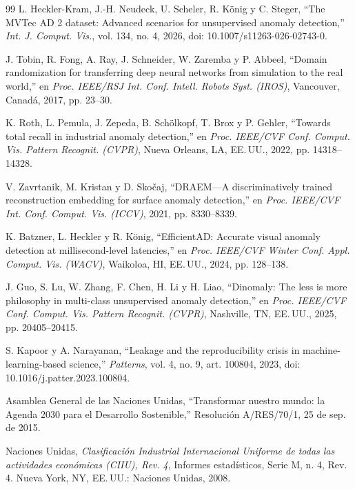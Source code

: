 \documentclass[12pt,oneside]{report}
\begin{document}
\begin{thebibliography}{99}
 L. Heckler-Kram, J.-H. Neudeck, U. Scheler, R. König y C. Steger, ``The MVTec AD 2 dataset: Advanced scenarios for unsupervised anomaly detection,'' \textit{Int. J. Comput. Vis.}, vol. 134, no. 4, 2026, doi: 10.1007/s11263-026-02743-0.

 J. Tobin, R. Fong, A. Ray, J. Schneider, W. Zaremba y P. Abbeel, ``Domain randomization for transferring deep neural networks from simulation to the real world,'' en \textit{Proc. IEEE/RSJ Int. Conf. Intell. Robots Syst. (IROS)}, Vancouver, Canadá, 2017, pp. 23--30.

 K. Roth, L. Pemula, J. Zepeda, B. Schölkopf, T. Brox y P. Gehler, ``Towards total recall in industrial anomaly detection,'' en \textit{Proc. IEEE/CVF Conf. Comput. Vis. Pattern Recognit. (CVPR)}, Nueva Orleans, LA, EE.\,UU., 2022, pp. 14318--14328.

 V. Zavrtanik, M. Kristan y D. Skočaj, ``DRAEM---A discriminatively trained reconstruction embedding for surface anomaly detection,'' en \textit{Proc. IEEE/CVF Int. Conf. Comput. Vis. (ICCV)}, 2021, pp. 8330--8339.

 K. Batzner, L. Heckler y R. König, ``EfficientAD: Accurate visual anomaly detection at millisecond-level latencies,'' en \textit{Proc. IEEE/CVF Winter Conf. Appl. Comput. Vis. (WACV)}, Waikoloa, HI, EE.\,UU., 2024, pp. 128--138.

 J. Guo, S. Lu, W. Zhang, F. Chen, H. Li y H. Liao, ``Dinomaly: The less is more philosophy in multi-class unsupervised anomaly detection,'' en \textit{Proc. IEEE/CVF Conf. Comput. Vis. Pattern Recognit. (CVPR)}, Nashville, TN, EE.\,UU., 2025, pp. 20405--20415.

 S. Kapoor y A. Narayanan, ``Leakage and the reproducibility crisis in machine-learning-based science,'' \textit{Patterns}, vol. 4, no. 9, art. 100804, 2023, doi: 10.1016/j.patter.2023.100804.

 Asamblea General de las Naciones Unidas, ``Transformar nuestro mundo: la Agenda 2030 para el Desarrollo Sostenible,'' Resolución A/RES/70/1, 25 de sep. de 2015.

 Naciones Unidas, \textit{Clasificación Industrial Internacional Uniforme de todas las actividades económicas (CIIU), Rev. 4}, Informes estadísticos, Serie M, n.\textordmasculine{} 4, Rev. 4. Nueva York, NY, EE.\,UU.: Naciones Unidas, 2008.


\end{thebibliography}
\end{document}
